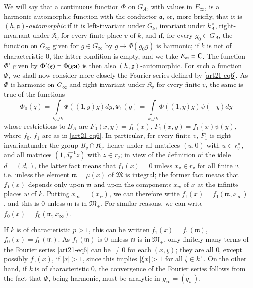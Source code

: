 We will say that a continuous function $\Phi$ on $G_{A}$, with values in $E_{\infty}$, is a harmonic automorphic function with the conductor $\mathfrak{a}$, or, more briefly, that it is $(h,\mathfrak{a})$-{\em automorphic} if it is left-invariant under $G_{k}$, invariant under $k^{\times}_{A}$, right-invariant under $\mathfrak{K}_{v}$ for every finite place $v$ of $k$, and if, for every $g_{0}\in G_{A}$, the function on $G_{\infty}$ given for $g\in G_{\infty}$ by $g\to \Phi(g_{0}g)$ is harmonic; if $k$ is not of characteristic $0$, the latter condition is empty, and we take $E_{\infty}=\mathbf{C}$. The function $\Phi'$ given by $\Phi'(g)=\Phi(g\mathbf{a})$ is then also $(h,\mathfrak{g})$-automorphic. For such a function $\Phi$, we shall now consider more closely the Fourier series defined by \eqref{art21-eq6}. As $\Phi$ is harmonic on $G_{\infty}$ and right-invariant under $\mathfrak{K}_{v}$ for every finite $v$, the same is true of the functions
$$
\Phi_{0}(g)=\int\limits_{k_{A}/k}\Phi((1,y)g)dy,\Phi_{1}(g)=\int\limits_{k_{A}/k}\Phi((1,y)g)\psi(-y)dy
$$
whose restrictions to $B_{A}$ are $F_{0}(x,y)=f_{0}(x)$, $F_{1}(x,y)=f_{1}(x)\psi (y)$, where $f_{0}$, $f_{1}$ are as in \eqref{art21-eq6}. In particular, for every finite $v$, $F_{1}$ is right-invariant\pageoriginale under the group $B_{v}\cap \mathfrak{K}_{v}$, hence under all matrices $(u,0)$ with $u\in r^{\times}_{v}$, and all matrices $(1,d^{-1}_{v}z)$ with $z\in r_{v}$; in view of the definition of the idele $d=(d_{v})$, the latter fact means that $f_{1}(x)=0$ unless $x_{v}\in r_{v}$ for all finite $v$, i.e. unless the element $\mathfrak{m}=\mu(x)$ of $\mathfrak{M}$ is integral; the former fact means that $f_{1}(x)$ depends only upon $\mathfrak{m}$ and upon the components $x_{w}$ of $x$ at the infinite places $w$ of $k$. Putting $x_{\infty}=(x_{w})$, we can therefore write $f_{1}(x)=f_{1}(\mathfrak{m},x_{\infty})$, and this is $0$ unless $\mathfrak{m}$ is in $\mathfrak{M}_{+}$. For similar reasons, we can write $f_{0}(x)=f_{0}(\mathfrak{m},x_{\infty})$.

If $k$ is of characteristic $p>1$, this can be written $f_{1}(x)=f_{1}(\mathfrak{m})$, $f_{0}(x)=f_{0}(\mathfrak{m})$. As $f_{1}(\mathfrak{m})$ is $0$ unless $\mathfrak{m}$ is in $\mathfrak{M}_{+}$, only finitely many terms of the Fourier series \eqref{art21-eq6} can be $\neq 0$ for each $(x,y)$; they are all $0$, except possibly $f_{0}(x)$, if $|x|>1$, since this implies $|\xi x|>1$ for all $\xi\in k^{\times}$. On the other hand, if $k$ is of characteristic $0$, the convergence of the Fourier series follows from the fact that $\Phi$, being harmonic, must be analytic in $g_{\infty}=(g_{w})$.

